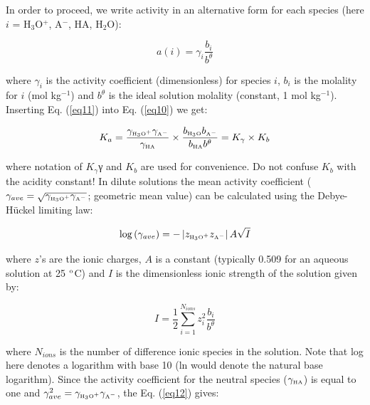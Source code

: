 \documentclass[byrevtex,amssymb,aps,pra,floatfix,letterpaper]{revtex4}
\begin{document}
\noindent
In order to proceed, we write activity in an alternative form for each species (here $i$ = H$_3$O$^+$, A$^-$, HA, H$_2$O):

\begin{equation}
a(i) = \gamma_i\frac{b_i}{b^\theta}
\label{eq11}
\end{equation}

\noindent
where $\gamma_i$ is the activity coefficient (dimensionless) for species $i$, $b_i$ is the molality for $i$ (mol kg$^{-1}$) and $b^\theta$ is the ideal solution molality (constant, 1 mol kg$^{-1}$). Inserting Eq. (\ref{eq11}) into Eq. (\ref{eq10}) we get:

\begin{equation}
K_a = \frac{\gamma_{\textnormal{\tiny H}_3\textnormal{\tiny O}^+}\gamma_{\textnormal{\tiny A}^-}}{\gamma_\textnormal{\tiny HA}} \times \frac{b_{\textnormal{\tiny H}_3\textnormal{\tiny O}}b_{\textnormal{\tiny A}^-}}{b_{\textnormal{\tiny HA}}b^\theta} = K_\gamma\times K_b
\label{eq12}
\end{equation}

\noindent
where notation of $K_\gamma$γ and $K_b$ are used for convenience. Do not confuse $K_b$ with the acidity constant! In dilute solutions the mean activity coefficient ($\gamma_{ave} = \sqrt{\gamma_{\textnormal{\tiny H}_3\textnormal{\tiny O}^+}\gamma_{\textnormal{\tiny A}^-}}$; geometric mean value) can be calculated using the Debye-Hückel limiting law:

\begin{equation}
\log\left(\gamma_{ave}\right) = -\left|z_{\textnormal{\tiny H}_3\textnormal{\tiny O}^+}z_{\textnormal{\tiny A}^-}\right|A\sqrt{I}
\label{eq13}
\end{equation}

\noindent
where $z$'s are the ionic charges, $A$ is a constant (typically 0.509 for an aqueous solution at 25 $^\textnormal{o}$C) and $I$ is the dimensionless ionic strength of the solution given by:

\begin{equation}
I = \frac{1}{2}\sum\limits_{i=1}^{N_{ions}}z_i^2\frac{b_i}{b^\theta}
\label{eq14}
\end{equation}

\noindent
where $N_{ions}$ is the number of difference ionic species in the solution. Note that log here denotes a logarithm with base 10 (ln would denote the natural base logarithm). Since the activity coefficient for the neutral species ($\gamma_\textnormal{\tiny HA}$) is equal to one and $\gamma_{ave}^2 = \gamma_{\textnormal{\tiny H}_3\textnormal{\tiny O}^+}\gamma_{\textnormal{\tiny A}^-}$, the Eq. (\ref{eq12}) gives:
\end{document}
